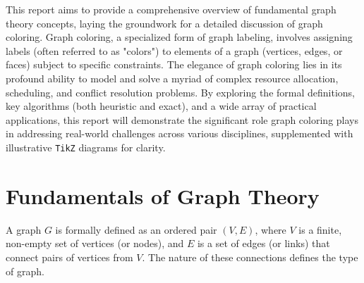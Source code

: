 \documentclass[11pt, a4paper]{article}
\begin{document}
This report aims to provide a comprehensive overview of fundamental graph theory concepts, laying the groundwork for a detailed discussion of graph coloring. Graph coloring, a specialized form of graph labeling, involves assigning labels (often referred to as "colors") to elements of a graph (vertices, edges, or faces) subject to specific constraints. The elegance of graph coloring lies in its profound ability to model and solve a myriad of complex resource allocation, scheduling, and conflict resolution problems. By exploring the formal definitions, key algorithms (both heuristic and exact), and a wide array of practical applications, this report will demonstrate the significant role graph coloring plays in addressing real-world challenges across various disciplines, supplemented with illustrative \texttt{TikZ} diagrams for clarity.

\section{Fundamentals of Graph Theory}
A graph $G$ is formally defined as an ordered pair $(V, E)$, where $V$ is a finite, non-empty set of vertices (or nodes), and $E$ is a set of edges (or links) that connect pairs of vertices from $V$. The nature of these connections defines the type of graph.
\end{document}
